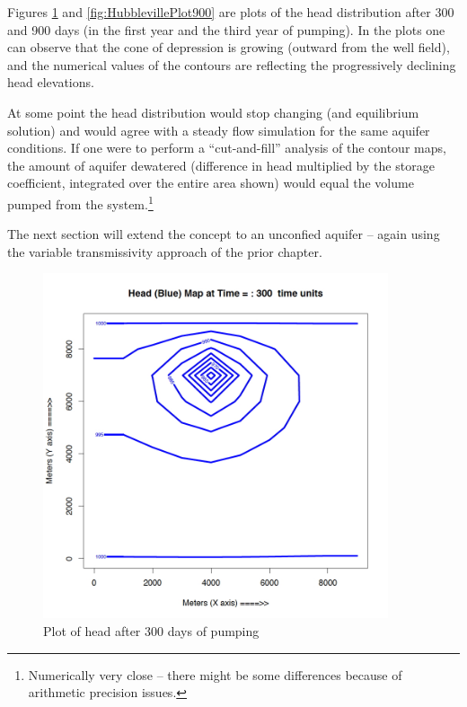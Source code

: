 Figures \ref{fig:HubblevillePlot300} and \ref{fig:HubblevillePlot900} are plots of the head distribution after 300 and 900 days (in the first year and the third year of pumping).
In the plots one can observe that the cone of depression is growing (outward from the well field), and the numerical values of the contours are reflecting the progressively declining head elevations.

At some point the head distribution would stop changing (and equilibrium solution) and would agree with a steady flow simulation for the same aquifer conditions.
If one were to perform a ``cut-and-fill'' analysis of the contour maps, the amount of aquifer dewatered (difference in head multiplied by the storage coefficient, integrated over the entire area shown) would equal the volume pumped from the system.\footnote{Numerically very close -- there might be some differences because of arithmetic precision issues.}

The next section will extend the concept to an unconfied aquifer -- again using the variable transmissivity approach of the prior chapter.

\begin{figure}[h!] %
   \centering
   \includegraphics[height=4in]{./18-UnsteadyGroundwaterFlow/HubblevillePlot300.jpg} 
   \caption{Plot of head after 300 days of pumping}
   \label{fig:HubblevillePlot300}
\end{figure}

